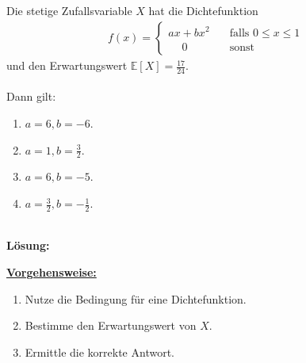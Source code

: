  
\newpage

\subsection*{}
Die stetige Zufallsvariable $ X $ hat die Dichtefunktion
\begin{align*}
f(x) =
\begin{cases}
ax + bx^2 \quad &\textrm{falls } 0 \leq x \leq 1\\
\quad  \  0 \ \ &\textrm{sonst}
\end{cases}
\end{align*}
und den Erwartungswert $ \mathbb{E}[X] = \frac{17}{24} $.\\
\\
Dann gilt:
\renewcommand{\labelenumi}{(\alph{enumi})}
\begin{enumerate}
	\item 
	$a= 6,b=-6$.
	\item
	$a= 1,b=\frac{3}{2}$.
	\item
	$a= 6,b=-5$.
	\item
	$a= \frac{3}{2},b=-\frac{1}{2}$.	
\end{enumerate}
\ \\
\textbf{Lösung:}
\begin{mdframed}
\underline{\textbf{Vorgehensweise:}}
\renewcommand{\labelenumi}{\theenumi.}
\begin{enumerate}
\item Nutze die Bedingung für eine Dichtefunktion.
\item Bestimme den Erwartungswert von $ X $.
\item Ermittle die korrekte Antwort.
\end{enumerate}
\end{mdframed}

